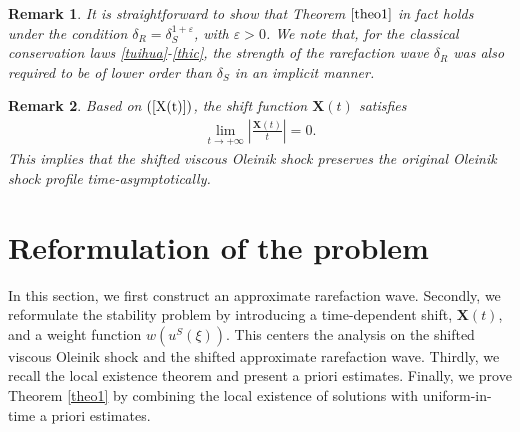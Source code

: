 \documentclass[10pt,reqno]{amsart}
\numberwithin{equation}{section}
\newtheorem{remark}{Remark}[section]
\begin{document}
	\begin{remark}
		It is straightforward  to show that Theorem $\ref{theo1}$ in fact holds under the condition $\delta_{R}=\delta_{S}^{1+\varepsilon}$, with $\varepsilon>0$.  We note that, for the classical conservation laws \eqref{tuihua}-\eqref{thic}, the strength of the rarefaction wave $\delta_R$ was also  required to be of lower order than $\delta_S$ in an implicit manner.
	\end{remark}
	\begin{remark}
		Based on $(\ref{X(t)})$, the shift function $\mathbf{X}(t)$ satisfies
		\begin{align*}
			\lim _{t \rightarrow+\infty}\left|\frac{\mathbf{X}(t)}{t}\right|=0.
		\end{align*}
		This implies that the shifted viscous Oleinik shock preserves the original Oleinik shock profile time-asymptotically.
	\end{remark}
	
	
	\section{Reformulation of the problem}\label{sec3}
	In this section, we first construct an approximate rarefaction wave. Secondly, we reformulate the stability problem by introducing a time-dependent shift, $\mathbf{X}(t)$, and a weight function $w(u^S(\xi))$. This centers the analysis on the shifted viscous Oleinik shock and the shifted approximate rarefaction wave. Thirdly, we recall the local existence theorem and present a priori estimates. Finally, we prove Theorem \ref{theo1} by combining the local existence of solutions with uniform-in-time a priori estimates.
	
\end{document}
